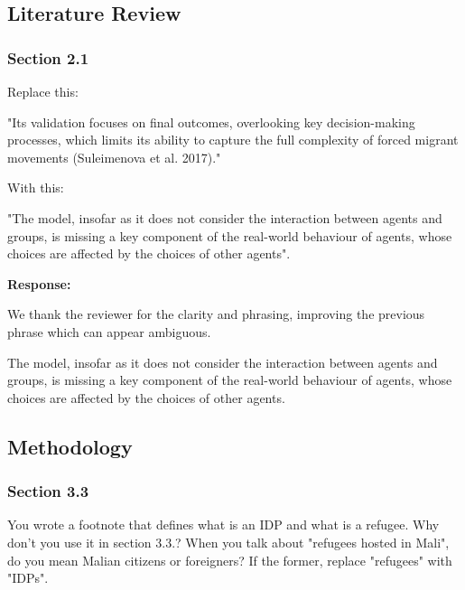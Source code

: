 \documentclass[11pt,a4paper]{article}
\begin{document}
\vspace{0.5cm}

\subsection*{Literature Review}

\subsubsection*{Section 2.1}

\begin{reviewbox}
Replace this:

"Its validation focuses on final outcomes, overlooking key decision-making processes, which limits its ability to capture
the full complexity of forced migrant movements (Suleimenova et al. 2017)."

With this:

"The model, insofar as it does not consider the interaction between agents and groups, is missing a key component of the real-world behaviour of agents, whose choices are affected by the choices of other agents".
\end{reviewbox}

\textbf{Response:}

We thank the reviewer for the clarity and phrasing, improving the previous phrase which can appear
ambiguous.

\vspace{0.5cm}

\begin{updatebox}
The model, 
insofar as it does not consider the interaction between agents and groups, is
missing a key component of the real-world behaviour of agents, whose choices are affected
by the choices of other agents.
\end{updatebox}

\vspace{0.5cm}

\subsection*{Methodology}

\subsubsection*{Section 3.3}

\begin{reviewbox}
You wrote a footnote that defines what is an IDP and what is a refugee. Why don't you use it in section 3.3.? When you talk about "refugees hosted in Mali", do you mean Malian citizens or foreigners? If the former, replace "refugees" with "IDPs".
\end{reviewbox}
\end{document}
